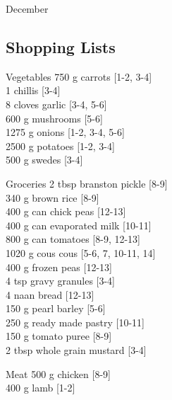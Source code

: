 \begin{menu}{December}
    \subsection*{Shopping Lists}
      \begin{shoppinglist}{Vegetables}
      750 g carrots {\scriptsize[1-2, 3-4]}\\
      1  chillis {\scriptsize[3-4]}\\
      8 cloves garlic {\scriptsize[3-4, 5-6]}\\
      600 g mushrooms {\scriptsize[5-6]}\\
      1275 g onions {\scriptsize[1-2, 3-4, 5-6]}\\
      2500 g potatoes {\scriptsize[1-2, 3-4]}\\
      500 g swedes {\scriptsize[3-4]}\\
      \end{shoppinglist}%
      \begin{shoppinglist}{Groceries}
      2 tbsp branston pickle {\scriptsize[8-9]}\\
      340 g brown rice {\scriptsize[8-9]}\\
      400 g can chick peas {\scriptsize[12-13]}\\
      400 g can evaporated milk {\scriptsize[10-11]}\\
      800 g can tomatoes {\scriptsize[8-9, 12-13]}\\
      1020 g cous cous {\scriptsize[5-6, 7, 10-11, 14]}\\
      400 g frozen peas {\scriptsize[12-13]}\\
      4 tsp gravy granules {\scriptsize[3-4]}\\
      4  naan bread {\scriptsize[12-13]}\\
      150 g pearl barley {\scriptsize[5-6]}\\
      250 g ready made pastry {\scriptsize[10-11]}\\
      150 g tomato puree {\scriptsize[8-9]}\\
      2 tbsp whole grain mustard {\scriptsize[3-4]}\\
      \end{shoppinglist}%
      \par\vfil %
      \begin{shoppinglist}{Meat}
      500 g chicken {\scriptsize[8-9]}\\
      400 g lamb {\scriptsize[1-2]}\\
      \end{shoppinglist}%

\end{menu}
